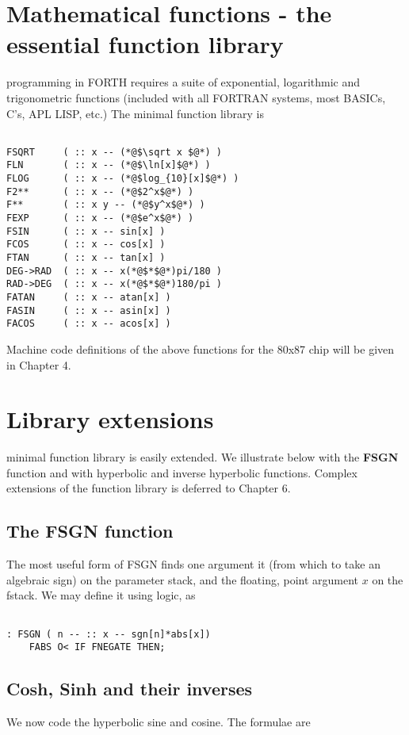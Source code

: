 \section{Mathematical functions - the essential function library}

 programming in FORTH requires a suite of exponential,
logarithmic and trigonometric functions (included with all
FORTRAN systems, most BASICs, C’s, APL LISP, etc.) The
minimal function library is

\begin{lstlisting}

FSQRT     ( :: x -- (*@$\sqrt x $@*) )
FLN       ( :: x -- (*@$\ln[x]$@*) )
FLOG      ( :: x -- (*@$log_{10}[x]$@*) )
F2**      ( :: x -- (*@$2^x$@*) )
F**       ( :: x y -- (*@$y^x$@*) )
FEXP      ( :: x -- (*@$e^x$@*) )
FSIN      ( :: x -- sin[x] )
FCOS      ( :: x -- cos[x] )
FTAN      ( :: x -- tan[x] )
DEG->RAD  ( :: x -- x(*@$*$@*)pi/180 )
RAD->DEG  ( :: x -- x(*@$*$@*)180/pi )
FATAN     ( :: x -- atan[x] )
FASIN     ( :: x -- asin[x] )
FACOS     ( :: x -- acos[x] )

\end{lstlisting}

Machine code definitions of the above functions for the 80x87
chip will be given in Chapter 4.

\section{Library extensions}

 minimal function library is easily extended. We illustrate
below with the \textbf{FSGN} function and with hyperbolic and inverse hyperbolic
functions. Complex extensions of the function
library is deferred to Chapter 6.

\subsection{The FSGN function}
The most useful form of FSGN finds one argument it (from which
to take an algebraic sign) on the parameter stack, and the floating,
point argument $x$ on the fstack. We may define it using logic, as
\begin{verbatim}

: FSGN ( n -- :: x -- sgn[n]*abs[x])
    FABS O< IF FNEGATE THEN;
\end{verbatim}

\subsection{Cosh, Sinh and their inverses}
We now code the hyperbolic sine and cosine. The formulae are

